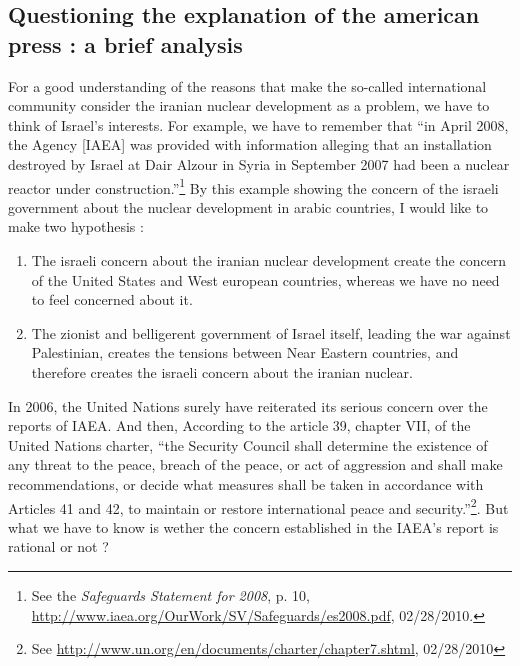 \documentclass[
paper=a4,
fontsize=10pt,
headsepline,
headings=normal,
version=last,
footinclude=true,
mpinclude=true,
fleqn
]{scrartcl}
\begin{document}
\textcolor{spot}{\section{Questioning the explanation of the american press : a brief analysis}}

For a good understanding of the reasons that make the so-called international community consider the iranian nuclear development as a problem, we have to think of Israel's interests. For example, we have to remember that \textquotedblleft in April 2008, the Agency [IAEA] was provided with information alleging that an installation
destroyed by Israel at Dair Alzour in Syria in September 2007 had been a nuclear reactor
under construction.\textquotedblright\footnote{See the \emph{Safeguards Statement for 2008}, p. 10, \url{http://www.iaea.org/OurWork/SV/Safeguards/es2008.pdf}, 02/28/2010.} By this example showing the concern of the israeli government about the nuclear development in arabic countries, I would like to make two hypothesis :
\begin{enumerate}
 \item
The israeli concern about the iranian nuclear development create the concern of the United States and West european countries, whereas we have no need to feel concerned about it.
\item
The zionist and belligerent government of Israel itself, leading the war against Palestinian, creates the tensions between Near Eastern countries, and therefore creates the israeli concern about the iranian nuclear.
\end{enumerate}

In 2006, the United Nations surely have reiterated its serious concern over the reports of IAEA. And then, According to the article 39, chapter VII, of the United Nations charter, \textquotedblleft the Security Council shall determine the existence of any threat to the peace, breach of the peace, or act of aggression and shall make recommendations, or decide what measures shall be taken in accordance with Articles 41 and 42, to maintain or restore international peace and security.\textquotedblright\footnote{See \url{http://www.un.org/en/documents/charter/chapter7.shtml}, 02/28/2010}. But what we have to know is wether the concern established in the IAEA's report is rational or not ?
\end{document}
